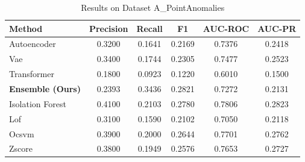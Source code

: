 \begin{table}[htbp]
\caption{Results on Dataset A_PointAnomalies}
\begin{center}
\begin{tabular}{|l|c|c|c|c|c|}
\hline
\textbf{Method} & \textbf{Precision} & \textbf{Recall} & \textbf{F1} & \textbf{AUC-ROC} & \textbf{AUC-PR} \\
\hline
Autoencoder & 0.3200 & 0.1641 & 0.2169 & 0.7376 & 0.2418 \\
Vae & 0.3400 & 0.1744 & 0.2305 & 0.7477 & 0.2523 \\
Transformer & 0.1800 & 0.0923 & 0.1220 & 0.6010 & 0.1500 \\
\hline
\textbf{Ensemble (Ours)} & 0.2393 & 0.3436 & 0.2821 & 0.7272 & 0.2131 \\
Isolation Forest & 0.4100 & 0.2103 & 0.2780 & 0.7806 & 0.2823 \\
Lof & 0.3100 & 0.1590 & 0.2102 & 0.7050 & 0.2118 \\
Ocsvm & 0.3900 & 0.2000 & 0.2644 & 0.7701 & 0.2762 \\
Zscore & 0.3800 & 0.1949 & 0.2576 & 0.7653 & 0.2727 \\
\hline
\hline
\end{tabular}
\label{tab:results_a_pointanomalies}
\end{center}
\end{table}